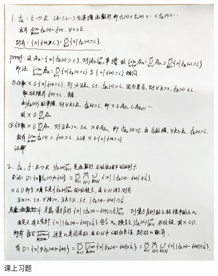 \documentclass[12pt, a4paper, oneside]{ctexart}
\begin{document}
{\begin{figure}[p]
        \centerline{\includegraphics[width=1.2\linewidth,height=1.1\textheight]{example2.jpg}}
        \caption{课上习题}
        \label{figure}

    \end{figure}

       
}
\end{document}

